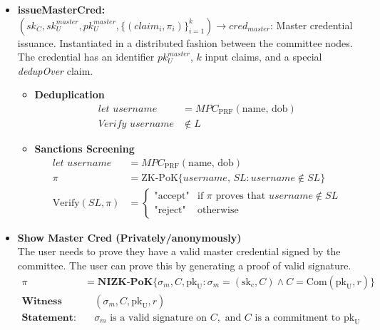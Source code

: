 \begin{itemize}
    \item \textbf{issueMasterCred: \( (sk_C, sk_U^{master}, pk_U^{master}, \{({claim}_i, \pi_i)\}_{i=1}^k) \rightarrow {cred_{master}} \)}: Master credential issuance. Instantiated in a distributed fashion between the committee nodes. The credential has an identifier \( pk_U^{master} \), \( k \) input claims, and a special \textit{dedupOver} claim.
    \begin{itemize}
        \item \textbf{Deduplication}
        \begin{align*}
            \textit{let username} &= \textit{MPC}_{\text{PRF}}(\text{name, dob}) \\
            \textit{Verify username} &\notin L
        \end{align*}
    
        \item \textbf{Sanctions Screening}
        \begin{align*}
            \textit{let username} &= \textit{MPC}_{\text{PRF}}(\text{name, dob}) \\
            \pi &= \text{ZK-PoK} \{username, \, SL: username \notin SL\} \\
            \text{Verify}(SL, \pi) &= 
            \begin{cases}
                \text{"accept"} & \text{if } \pi \text{ proves that } username \notin SL \\
                \text{"reject"} & \text{otherwise}
            \end{cases}
        \end{align*}
    \end{itemize}
    
    \item \textbf{Show Master Cred (Privately/anonymously)}\\
    The user needs to prove they have a valid master credential signed by the committee. The user can prove this by generating a proof of valid signature.
    \begin{align*}
        \pi &= \textbf{NIZK-PoK}\{\sigma_{m}, C, \text{pk}_{\text{U}} : \sigma_{m} = (\text{sk}_{\text{c}}, C) \wedge C = \text{Com}(\text{pk}_{\text{U}}, r)\} \\
        \textbf{Witness} &\quad (\sigma_{m}, C, \text{pk}_{\text{U}}, r) \\
        \textbf{Statement:} &\quad \sigma_{m} \text{ is a valid signature on } C, \text{ and } C \text{ is a commitment to } \text{pk}_{\text{U}}\\
    \end{align*}
\end{itemize}


